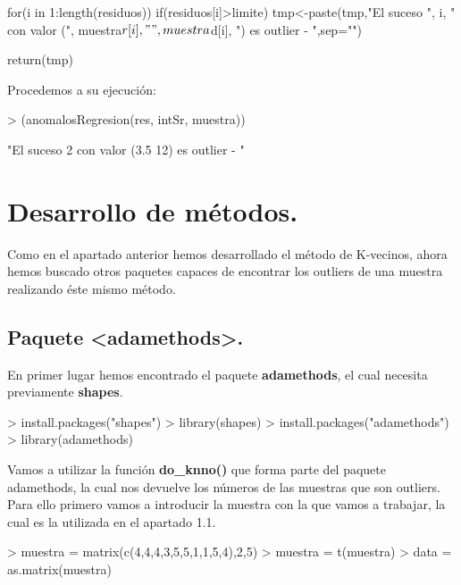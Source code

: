 \documentclass [a4paper] {article}
\begin{document}
\begin{enumerate}
\begin{Schunk}
\begin{Soutput}
{    for(i in 1:length(residuos)){
        if(residuos[i]>limite){
            tmp<-paste(tmp,"El suceso ", i, 
                " con valor (", muestra$r[i]," ",
                 muestra$d[i], ") es outlier - ",sep="")
        }
    }

    return(tmp)
}
\end{Soutput}
\end{Schunk}

\bigskip
Procedemos a su ejecución:
\begin{Schunk}
\begin{Sinput}
> (anomalosRegresion(res, intSr, muestra))
\end{Sinput}
\begin{Soutput}
[1] "El suceso 2 con valor (3.5 12) es outlier - "
\end{Soutput}
\end{Schunk}

\end{enumerate}

\bigskip
\section{Desarrollo de métodos.}

\bigskip
Como en el apartado anterior hemos desarrollado el método de K-vecinos, ahora hemos buscado
otros paquetes capaces de encontrar los outliers de una muestra realizando éste mismo método.

\subsection{Paquete <adamethods>.}
\bigskip
En primer lugar hemos encontrado el paquete \textbf{adamethods}, el cual necesita previamente
\textbf{shapes}.
\begin{Schunk}
\begin{Sinput}
> install.packages("shapes")
> library(shapes)
> install.packages("adamethods")
> library(adamethods)
\end{Sinput}
\end{Schunk}

\bigskip
Vamos a utilizar la función \textbf{do\_knno()} que forma parte del paquete adamethods, la cual
nos devuelve los números de las muestras que son outliers. Para ello primero vamos a introducir
la muestra con la que vamos a trabajar, la cual es la utilizada en el apartado 1.1.
\begin{Schunk}
\begin{Sinput}
> muestra = matrix(c(4,4,4,3,5,5,1,1,5,4),2,5)
> muestra = t(muestra)
> data = as.matrix(muestra)
\end{Sinput}
\end{Schunk}
\end{document}
